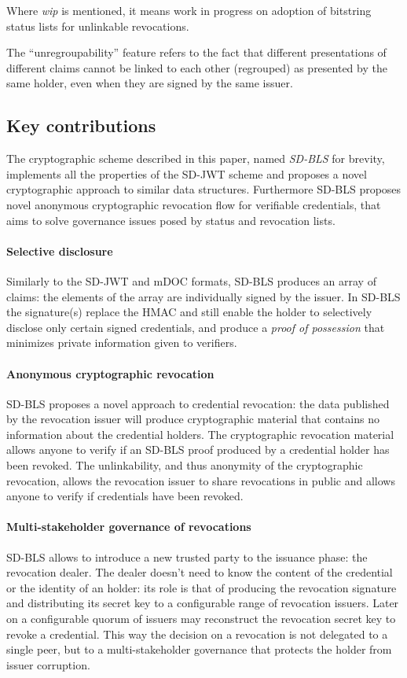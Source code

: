 Where \emph{wip} is mentioned, it means work in progress on adoption of
bitstring status lists for unlinkable revocations.

The ``unregroupability'' feature refers to the fact that different
presentations of different claims cannot be linked to each other
(regrouped) as presented by the same holder, even when they are signed
by the same issuer.

\subsection{Key contributions}
The cryptographic scheme described in this paper, named
\textit{SD-BLS} for brevity, implements all the properties of the
SD-JWT scheme and proposes a novel cryptographic approach to similar
data structures. Furthermore SD-BLS proposes novel anonymous
cryptographic revocation flow for verifiable credentials, that aims to
solve governance issues posed by status and revocation lists.

\paragraph{Selective disclosure}
Similarly to the SD-JWT and mDOC formats, SD-BLS produces an array of
claims: the elements of the array are individually signed by the
issuer. In SD-BLS the signature(s) replace the HMAC and still enable
the holder to selectively disclose only certain signed credentials,
and produce a \textit{proof of possession} that minimizes private
information given to verifiers.

\paragraph{Anonymous cryptographic revocation}
SD-BLS proposes a novel approach to credential revocation: the data
published by the revocation issuer will produce cryptographic material
that contains no information about the credential holders. The
cryptographic revocation material allows anyone to verify if an SD-BLS
proof produced by a credential holder has been revoked. The
unlinkability, and thus anonymity of the cryptographic revocation,
allows the revocation issuer to share revocations in public and allows
anyone to verify if credentials have been revoked.

\paragraph{Multi-stakeholder governance of revocations}
SD-BLS allows to introduce a new trusted party to the issuance phase:
the revocation dealer. The dealer doesn't need to know the content of
the credential or the identity of an holder: its role is that of
producing the revocation signature and distributing its secret key to
a configurable range of revocation issuers. Later on a configurable
quorum of issuers may reconstruct the revocation secret key to revoke
a credential. This way the decision on a revocation is not delegated
to a single peer, but to a multi-stakeholder governance that protects
the holder from issuer corruption.

